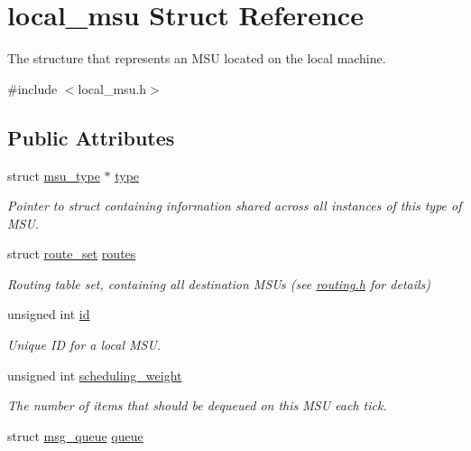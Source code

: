\hypertarget{structlocal__msu}{\section{local\-\_\-msu Struct Reference}
\label{structlocal__msu}
}


The structure that represents an M\-S\-U located on the local machine.  




{\ttfamily \#include $<$local\-\_\-msu.\-h$>$}

\subsection*{Public Attributes}
\begin{DoxyCompactItemize}
\item 
struct \hyperlink{structmsu__type}{msu\-\_\-type} $\ast$ \hyperlink{structlocal__msu_a4a5eb0c93e0be80ec816c050662885b3}{type}
\begin{DoxyCompactList}\small\item\em Pointer to struct containing information shared across all instances of this type of M\-S\-U. \end{DoxyCompactList}\item 
struct \hyperlink{structroute__set}{route\-\_\-set} \hyperlink{structlocal__msu_ad5a5a49f5e637d526668a373fd741ad8}{routes}
\begin{DoxyCompactList}\small\item\em Routing table set, containing all destination M\-S\-Us (see \hyperlink{routing_8h}{routing.\-h} for details) \end{DoxyCompactList}\item 
unsigned int \hyperlink{structlocal__msu_a1ca7fa0ae8f056072f5e92b895b7be1e}{id}
\begin{DoxyCompactList}\small\item\em Unique I\-D for a local M\-S\-U. \end{DoxyCompactList}\item 
unsigned int \hyperlink{structlocal__msu_afa2bd1495e53a10cf352af70aaaba10d}{scheduling\-\_\-weight}
\begin{DoxyCompactList}\small\item\em The number of items that should be dequeued on this M\-S\-U each tick. \end{DoxyCompactList}\item 
struct \hyperlink{structmsg__queue}{msg\-\_\-queue} \hyperlink{structlocal__msu_a33cb8e5c68228acf60cbf1869ff2a395}{queue}

\end{DoxyCompactItemize}
